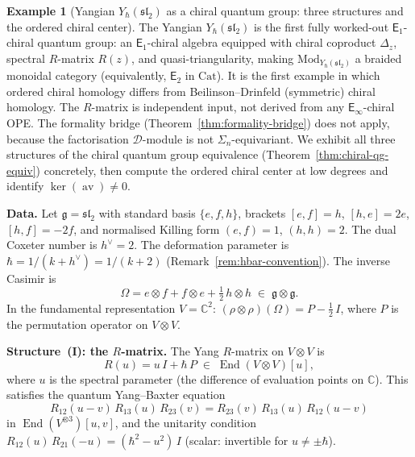 \documentclass[11pt,reqno]{amsart}
\theoremstyle{definition}
\newtheorem{example}[theorem]{Example}
\theoremstyle{remark}
\newcommand{\cD}{\mathcal{D}}
\newcommand{\Eone}{\mathsf{E}_{1}}
\newcommand{\Etwo}{\mathsf{E}_{2}}
\newcommand{\Einf}{\mathsf{E}_{\infty}}
\newcommand{\Cat}{\mathrm{Cat}}
\DeclareMathOperator{\End}{End}
\DeclareMathOperator{\av}{av}
\newcommand{\fg}{\mathfrak{g}}
\newcommand{\CC}{\mathbb{C}}
\numberwithin{equation}{section}
\begin{document}
\begin{example}[Yangian $Y_\hbar(\mathfrak{sl}_2)$
as a chiral quantum group: three structures and the
ordered chiral center]
\label{ex:yangian}
The Yangian $Y_\hbar(\mathfrak{sl}_2)$ is the first fully
worked-out $\Eone$-chiral quantum group: an $\Eone$-chiral
algebra equipped with chiral coproduct $\Delta_z$, spectral
$R$-matrix $R(z)$, and quasi-triangularity, making
$\mathrm{Mod}_{Y_\hbar(\mathfrak{sl}_2)}$ a braided
monoidal category (equivalently, $\Etwo$ in $\Cat$).
It is the first example in which ordered chiral homology
differs from Beilinson--Drinfeld (symmetric) chiral homology.
The $R$-matrix is independent input, not derived from any
$\Einf$-chiral OPE.
The formality bridge (Theorem~\ref{thm:formality-bridge})
does not apply, because the factorisation $\cD$-module is not
$\Sigma_n$-equivariant. We exhibit all three structures of
the chiral quantum group equivalence
(Theorem~\ref{thm:chiral-qg-equiv}) concretely, then compute
the ordered chiral center at low degrees and identify
$\ker(\av) \neq 0$.

\medskip
\noindent
\textbf{Data.} Let $\fg = \mathfrak{sl}_2$ with standard
basis $\{e, f, h\}$, brackets $[e,f] = h$, $[h,e] = 2e$,
$[h,f] = -2f$, and normalised Killing form $(e,f) = 1$,
$(h,h) = 2$. The dual Coxeter number is $h^\vee = 2$.
The deformation parameter is
$\hbar = 1/(k + h^\vee) = 1/(k + 2)$
(Remark~\ref{rem:hbar-convention}).
The inverse Casimir is
\begin{equation}\label{eq:yangian-casimir}
  \Omega = e \otimes f + f \otimes e
  + \tfrac{1}{2}\,h \otimes h
  \;\in\; \fg \otimes \fg.
\end{equation}
In the fundamental representation $V = \CC^2$:
$(\rho \otimes \rho)(\Omega) = P - \tfrac{1}{2}\,I$,
where $P$ is the permutation operator on $V \otimes V$.

\medskip
\noindent
\textbf{Structure~(I): the $R$-matrix.}
The Yang $R$-matrix on $V \otimes V$ is
\begin{equation}\label{eq:yangian-rmatrix}
  R(u) = u\,I + \hbar\,P
  \;\in\; \End(V \otimes V)[u],
\end{equation}
where $u$ is the spectral parameter (the difference of
evaluation points on $\CC$). This satisfies the quantum
Yang--Baxter equation
\begin{equation}\label{eq:yangian-qybe}
  R_{12}(u - v)\,R_{13}(u)\,R_{23}(v)
  = R_{23}(v)\,R_{13}(u)\,R_{12}(u - v)
\end{equation}
in $\End(V^{\otimes 3})[u, v]$, and the unitarity condition
$R_{12}(u)\,R_{21}(-u) = (\hbar^2 - u^2)\,I$
(scalar: invertible for $u \neq \pm\hbar$).


\end{example}
\end{document}
